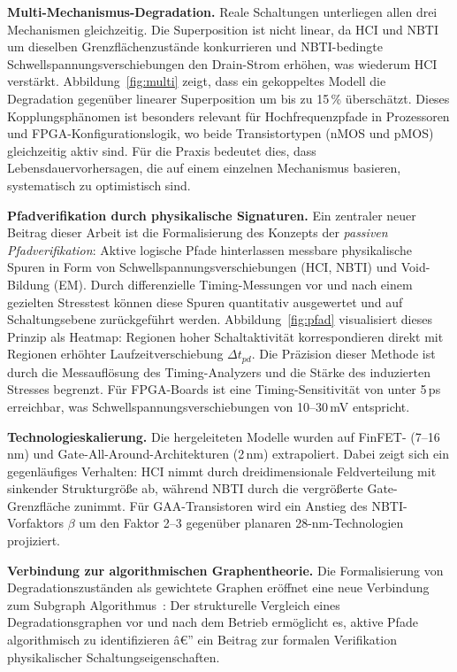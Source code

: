 ﻿\documentclass[a4paper,12pt]{article}
\theoremstyle{definition}
\begin{document}
\textbf{Multi-Mechanismus-Degradation.}
Reale Schaltungen unterliegen allen drei Mechanismen gleichzeitig. Die Superposition
ist nicht linear, da HCI und NBTI um dieselben Grenzflächenzustände konkurrieren
und NBTI-bedingte Schwellspannungsverschiebungen den Drain-Strom erhöhen, was
wiederum HCI verstärkt. Abbildung~\ref{fig:multi} zeigt, dass ein gekoppeltes Modell
die Degradation gegenüber linearer Superposition um bis zu 15\,\% überschätzt.
Dieses Kopplungsphänomen ist besonders relevant für Hochfrequenzpfade in
Prozessoren und FPGA-Konfigurationslogik, wo beide Transistortypen (nMOS und pMOS)
gleichzeitig aktiv sind. Für die Praxis bedeutet dies, dass Lebensdauervorhersagen,
die auf einem einzelnen Mechanismus basieren, systematisch zu optimistisch sind.

\textbf{Pfadverifikation durch physikalische Signaturen.}
Ein zentraler neuer Beitrag dieser Arbeit ist die Formalisierung des Konzepts der
\emph{passiven Pfadverifikation}: Aktive logische Pfade hinterlassen messbare
physikalische Spuren in Form von Schwellspannungsverschiebungen (HCI, NBTI)
und Void-Bildung (EM). Durch differenzielle Timing-Messungen vor und nach einem
gezielten Stresstest können diese Spuren quantitativ ausgewertet und auf
Schaltungsebene zurückgeführt werden. Abbildung~\ref{fig:pfad} visualisiert
dieses Prinzip als Heatmap: Regionen hoher Schaltaktivität korrespondieren direkt
mit Regionen erhöhter Laufzeitverschiebung $\Delta t_{pd}$.
Die Präzision dieser Methode ist durch die Messauflösung des Timing-Analyzers
und die Stärke des induzierten Stresses begrenzt. Für FPGA-Boards ist eine
Timing-Sensitivität von unter 5\,ps erreichbar, was Schwellspannungsverschiebungen
von 10--30\,mV entspricht.

\textbf{Technologieskalierung.}
Die hergeleiteten Modelle wurden auf FinFET- (7--16\,nm) und
Gate-All-Around-Architekturen (2\,nm) extrapoliert. Dabei zeigt sich ein
gegenläufiges Verhalten: HCI nimmt durch dreidimensionale Feldverteilung mit
sinkender Strukturgröße ab, während NBTI durch die vergrößerte Gate-Grenzfläche
zunimmt. Für GAA-Transistoren wird ein Anstieg des NBTI-Vorfaktors $\beta$
um den Faktor 2--3 gegenüber planaren 28-nm-Technologien projiziert.

\textbf{Verbindung zur algorithmischen Graphentheorie.}
Die Formalisierung von Degradationszuständen als gewichtete Graphen eröffnet
eine neue Verbindung zum Subgraph Algorithmus~\cite{epp2026}: Der
strukturelle Vergleich eines Degradationsgraphen vor und nach dem Betrieb
ermöglicht es, aktive Pfade algorithmisch zu identifizieren â€” ein Beitrag zur
formalen Verifikation physikalischer Schaltungseigenschaften.
\end{document}
